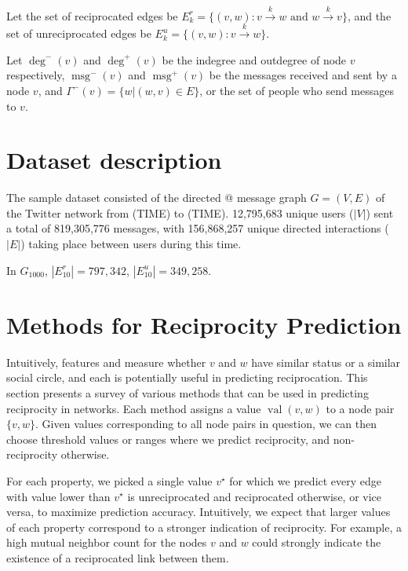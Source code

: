 \documentclass[conference]{IEEEtran}
\begin{document}
Let the set of reciprocated edges be \(E_k^r = \{ (v,w) : v \xrightarrow{k} w \text{ and } w \xrightarrow{k} v \} \), and the set of unreciprocated edges be \(E_k^u = \{ (v,w) : v \xrightarrow{k} w\} \).

Let $\deg^-(v)$ and $\deg^+(v)$ be the indegree and outdegree of node $v$ respectively, $\operatorname{msg}^-(v)$ and $\operatorname{msg}^+(v)$ be the messages received and sent by a node $v$, and $\Gamma^-(v) = \{w| (w,v) \in E\}$, or the set of people who send messages to $v$.

\section{Dataset description}
The sample dataset consisted of the directed @ message graph $G=(V,E)$ of the Twitter network from (TIME) to (TIME). 12,795,683 unique users ($|V|$) sent a total of 819,305,776 messages, with 156,868,257 unique directed interactions ($|E|$) taking place between users during this time.

In $G_{1000}$, $|E^r_{10}| = 797,342$, $|E^u_{10}| = 349,258$.

\section{Methods for Reciprocity Prediction}
Intuitively, features and measure whether $v$ and $w$ have similar status or a similar social circle, and each is potentially useful in predicting reciprocation. This section presents a survey of various methods that can be used in predicting reciprocity in networks. Each method assigns a value $\operatorname{val}(v,w)$ to a node pair $\{v,w\}$. Given values corresponding to all node pairs in question, we can then choose threshold values or ranges where we predict reciprocity, and non-reciprocity otherwise.

For each property, we picked a single value $v^\star$ for which we predict every edge with value lower than $v^\star$ is unreciprocated and reciprocated otherwise, or vice versa, to maximize prediction accuracy. Intuitively, we expect that larger values of each property correspond to a stronger indication of reciprocity. For example, a high mutual neighbor count for the nodes $v$ and $w$ could strongly indicate the existence of a reciprocated link between them.
\end{document}
